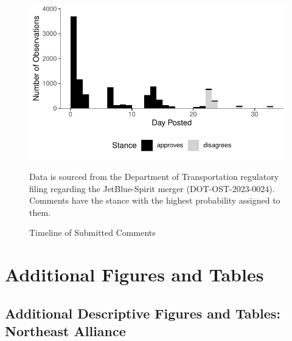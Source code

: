 \documentclass{article}
\begin{document}
\begin{appendices}
    \begin{figure}[h]
		\caption{Timeline of Submitted Comments}
		\label{fig:CommentTimeline}
        \begin{center}
    	\includegraphics{stance_submission_timeline}
        \end{center}
		\begin{minipage}{\textwidth} 
			{\footnotesize Data is sourced from the Department of Transportation regulatory filing regarding the JetBlue-Spirit merger  (DOT-OST-2023-0024). Comments have the stance with the highest probability assigned to them.} 
		\end{minipage}
	\end{figure}
	
	
	

	\FloatBarrier
	\pagebreak
	\section{Additional Figures and Tables}	

	\subsection{Additional Descriptive Figures and Tables: Northeast Alliance}
	
%			


\end{appendices}
\end{document}
